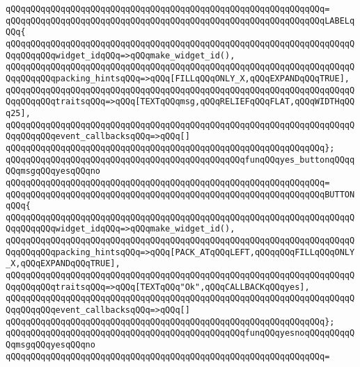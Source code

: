 \verb|qQQqqQQqqQQqqQQqqQQqqQQqqQQqqQQqqQQqqQQqqQQqqQQqqQQqqQQqqQQqqQQq=|\newline
\verb|qQQqqQQqqQQqqQQqqQQqqQQqqQQqqQQqqQQqqQQqqQQqqQQqqQQqqQQqqQQqqQQqLABELqQQq{|\newline
\verb|qQQqqQQqqQQqqQQqqQQqqQQqqQQqqQQqqQQqqQQqqQQqqQQqqQQqqQQqqQQqqQQqqQQqqQQqqQQqqQQqwidget_idqQQq=>qQQqmake_widget_id(),|\newline
\verb|qQQqqQQqqQQqqQQqqQQqqQQqqQQqqQQqqQQqqQQqqQQqqQQqqQQqqQQqqQQqqQQqqQQqqQQqqQQqqQQqpacking_hintsqQQq=>qQQq[FILLqQQqONLY_X,qQQqEXPANDqQQqTRUE],|\newline
\verb|qQQqqQQqqQQqqQQqqQQqqQQqqQQqqQQqqQQqqQQqqQQqqQQqqQQqqQQqqQQqqQQqqQQqqQQqqQQqqQQqtraitsqQQq=>qQQq[TEXTqQQqmsg,qQQqRELIEFqQQqFLAT,qQQqWIDTHqQQq25],|\newline
\verb|qQQqqQQqqQQqqQQqqQQqqQQqqQQqqQQqqQQqqQQqqQQqqQQqqQQqqQQqqQQqqQQqqQQqqQQqqQQqqQQqevent_callbacksqQQq=>qQQq[]|\newline
\verb|qQQqqQQqqQQqqQQqqQQqqQQqqQQqqQQqqQQqqQQqqQQqqQQqqQQqqQQqqQQqqQQq};|\newline
\verb|qQQqqQQqqQQqqQQqqQQqqQQqqQQqqQQqqQQqqQQqqQQqqQQqfunqQQqyes_buttonqQQqqQQqmsgqQQqyesqQQqno|\newline
\verb|qQQqqQQqqQQqqQQqqQQqqQQqqQQqqQQqqQQqqQQqqQQqqQQqqQQqqQQqqQQqqQQq=|\newline
\verb|qQQqqQQqqQQqqQQqqQQqqQQqqQQqqQQqqQQqqQQqqQQqqQQqqQQqqQQqqQQqqQQqBUTTONqQQq{|\newline
\verb|qQQqqQQqqQQqqQQqqQQqqQQqqQQqqQQqqQQqqQQqqQQqqQQqqQQqqQQqqQQqqQQqqQQqqQQqqQQqqQQqwidget_idqQQq=>qQQqmake_widget_id(),|\newline
\verb|qQQqqQQqqQQqqQQqqQQqqQQqqQQqqQQqqQQqqQQqqQQqqQQqqQQqqQQqqQQqqQQqqQQqqQQqqQQqqQQqpacking_hintsqQQq=>qQQq[PACK_ATqQQqLEFT,qQQqqQQqFILLqQQqONLY_X,qQQqEXPANDqQQqTRUE],|\newline
\verb|qQQqqQQqqQQqqQQqqQQqqQQqqQQqqQQqqQQqqQQqqQQqqQQqqQQqqQQqqQQqqQQqqQQqqQQqqQQqqQQqtraitsqQQq=>qQQq[TEXTqQQq"Ok",qQQqCALLBACKqQQqyes],|\newline
\verb|qQQqqQQqqQQqqQQqqQQqqQQqqQQqqQQqqQQqqQQqqQQqqQQqqQQqqQQqqQQqqQQqqQQqqQQqqQQqqQQqevent_callbacksqQQq=>qQQq[]|\newline
\verb|qQQqqQQqqQQqqQQqqQQqqQQqqQQqqQQqqQQqqQQqqQQqqQQqqQQqqQQqqQQqqQQq};|\newline
\newline
\verb|qQQqqQQqqQQqqQQqqQQqqQQqqQQqqQQqqQQqqQQqqQQqqQQqfunqQQqyesnoqQQqqQQqqQQqmsgqQQqyesqQQqno|\newline
\verb|qQQqqQQqqQQqqQQqqQQqqQQqqQQqqQQqqQQqqQQqqQQqqQQqqQQqqQQqqQQqqQQq=|\newline
